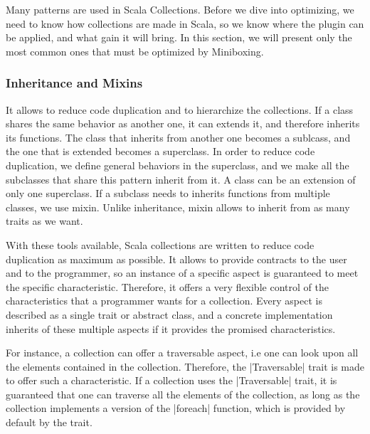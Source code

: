 Many patterns are used in Scala Collections. Before we dive into optimizing, we need to know how collections are made in Scala, so we know where the plugin can be applied, and what gain it will bring. In this section, we will present only the most common ones that must be optimized by Miniboxing.


\subsubsection{Inheritance and Mixins}

 It allows to reduce code duplication and to hierarchize the collections. If a class shares the same behavior as another one, it can extends it, and therefore inherits its functions. The class that inherits from another one becomes a sublcass, and the one that is extended becomes a superclass. In order to reduce code duplication, we define general behaviors in the superclass, and we make all the subclasses that share this pattern inherit from it. A class can be an extension of only one superclass. If a subclass needs to inherits functions from multiple classes, we use mixin. Unlike inheritance, mixin allows to inherit from as many traits as we want.

With these tools available, Scala collections are written to reduce code duplication as maximum as possible.  It allows to provide contracts to the user and to the programmer, so an instance of a specific aspect is guaranteed to meet the specific characteristic. Therefore, it offers a very flexible control of the characteristics that a programmer wants for a collection. Every aspect is described as a single trait or abstract class, and a concrete implementation inherits of these multiple aspects if it provides the promised characteristics.

For instance, a collection can offer a traversable aspect, i.e one can look upon all the elements contained in the collection. Therefore, the |Traversable| trait is made to offer such a characteristic. If a collection uses the |Traversable| trait, it is guaranteed that one can traverse all the elements of the collection, as long as the collection implements a version of the |foreach| function, which is provided by default by the trait.



